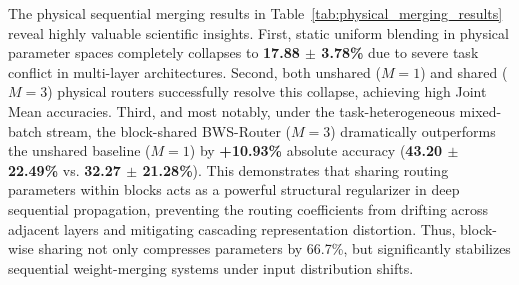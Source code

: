 The physical sequential merging results in Table~\ref{tab:physical_merging_results} reveal highly valuable scientific insights. 
First, static uniform blending in physical parameter spaces completely collapses to \textbf{17.88 $\pm$ 3.78\%} due to severe task conflict in multi-layer architectures. 
Second, both unshared ($M=1$) and shared ($M=3$) physical routers successfully resolve this collapse, achieving high Joint Mean accuracies. 
Third, and most notably, under the task-heterogeneous mixed-batch stream, the block-shared BWS-Router ($M=3$) dramatically outperforms the unshared baseline ($M=1$) by \textbf{+10.93\%} absolute accuracy (\textbf{43.20 $\pm$ 22.49\%} vs. \textbf{32.27 $\pm$ 21.28\%}). This demonstrates that sharing routing parameters within blocks acts as a powerful structural regularizer in deep sequential propagation, preventing the routing coefficients from drifting across adjacent layers and mitigating cascading representation distortion. Thus, block-wise sharing not only compresses parameters by 66.7\%, but significantly stabilizes sequential weight-merging systems under input distribution shifts.

